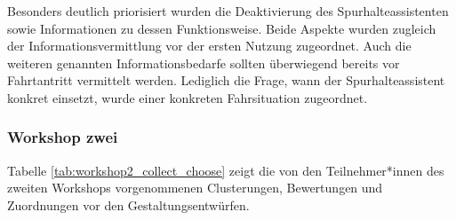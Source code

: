 Besonders deutlich priorisiert wurden die Deaktivierung des Spurhalteassistenten sowie Informationen zu dessen Funktionsweise. Beide Aspekte wurden zugleich der Informationsvermittlung vor der ersten Nutzung zugeordnet. Auch die weiteren genannten Informationsbedarfe sollten überwiegend bereits vor Fahrtantritt vermittelt werden. Lediglich die Frage, wann der Spurhalteassistent konkret einsetzt, wurde einer konkreten Fahrsituation zugeordnet.

\subsubsection{Workshop zwei}
\label{subsubsec:Ergebnisse_Workshop_zwei}

Tabelle \ref{tab:workshop2_collect_choose} zeigt die von den Teilnehmer*innen des zweiten Workshops vorgenommenen Clusterungen, Bewertungen und Zuordnungen vor den Gestaltungsentwürfen.

